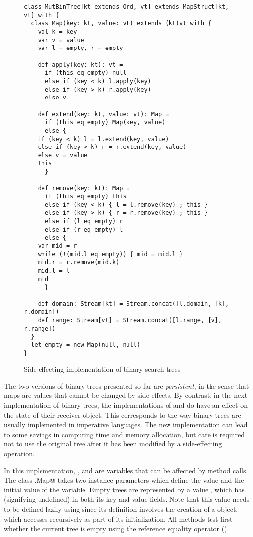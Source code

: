 \documentclass[11pt]{report}
\begin{document}
{\begin{figure}
\begin{verbatim}
class MutBinTree[kt extends Ord, vt] extends MapStruct[kt, vt] with {
  class Map(key: kt, value: vt) extends (kt)vt with {
    val k = key
    var v = value
    var l = empty, r = empty

    def apply(key: kt): vt =
      if (this eq empty) null
      else if (key < k) l.apply(key)
      else if (key > k) r.apply(key)
      else v

    def extend(key: kt, value: vt): Map =
      if (this eq empty) Map(key, value)
      else {
	if (key < k) l = l.extend(key, value)
	else if (key > k) r = r.extend(key, value)
	else v = value
	this
      }

    def remove(key: kt): Map =
      if (this eq empty) this
      else if (key < k) { l = l.remove(key) ; this }
      else if (key > k) { r = r.remove(key) ; this }
      else if (l eq empty) r
      else if (r eq empty) l
      else {
	var mid = r
	while (!(mid.l eq empty)) { mid = mid.l }
	mid.r = r.remove(mid.k)
	mid.l = l
	mid
      }

    def domain: Stream[kt] = Stream.concat([l.domain, [k], r.domain])
    def range: Stream[vt] = Stream.concat([l.range, [v], r.range])
  }
  let empty = new Map(null, null)
}
\end{verbatim}
\caption{\label{fig:impbintree}Side-effecting implementation of binary
search trees}
\end{figure}

The two versions of binary trees presented so far are {\em
persistent}, in the sense that maps are values that cannot be changed
by side effects. By contrast, in the next implementation of binary
trees, the implementations of \verb@extend@ and
\verb@remove@ do have an effect on the state of their receiver
object. This corresponds to the way binary trees are usually
implemented in imperative languages. The new implementation can lead
to some savings in computing time and memory allocation, but care is
required not to use the original tree after it has been modified by a
side-effecting operation.

In this implementation, \verb@value@, \verb@l@ and \verb@r@ are
variables that can be affected by method calls.  The
class \verb@MutBinTree[kt, vt].Map@ takes two instance parameters
which define the \verb@key@ value and the initial value of the
\verb@value@ variable. Empty trees are represented by a
value \verb@empty@, which has \verb@null@ (signifying undefined) in
both its key and value fields. Note that this value needs to be
defined lazily using \verb@let@ since its definition involves the
creation of a
\verb@Map@ object,
which accesses \verb@empty@ recursively as part of its initialization.
All methods test first whether the current tree is empty using the
reference equality operator \verb@eq@ ().

}
\end{document}
